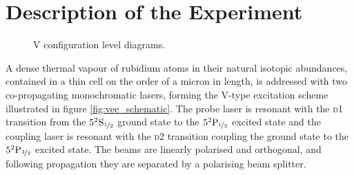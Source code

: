\section{Description of the Experiment}
  \label{sec:simultons_experiment}

    \begin{figure}
      \centering     %
      \caption{V configuration level diagrams.}
    \end{figure}

    A dense thermal vapour of rubidium atoms in their natural isotopic
    abundances, contained in a thin cell on the order of a micron in length, is
    addressed with two co-propagating monochromatic lasers, forming the V-type
    excitation scheme illustrated in figure \ref{fig:vee_schematic}. The probe
    laser is resonant with the \textsc{d1} transition from the
    $5^2\mathrm{S}_{\nicefrac{1}{2}}$ ground state to the
    $5^2\mathrm{P}_{\nicefrac{1}{2}}$ excited state and the coupling laser is
    resonant with the \textsc{d2} transition coupling the ground state to the
    $5^2\mathrm{P}_{\nicefrac{3}{2}}$ excited state\cite{Arimondo1977,
    Banerjee2007}. The beams are linearly polarised and orthogonal, and
    following propagation they are separated by a polarising beam splitter.

